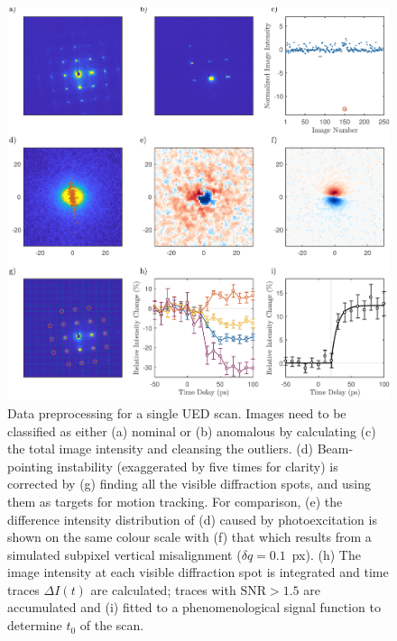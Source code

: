 \begin{figure}[ht!]
  \centering
  \includegraphics[width = \textwidth]{Figures/fig_UED_preprocess.pdf}
  \caption[Data preprocessing for a single UED scan.]{
  Data preprocessing for a single UED scan.
  Images need to be classified as either (a) nominal or (b) anomalous
  by calculating (c) the total image intensity and cleansing the outliers.
  (d) Beam-pointing instability (exaggerated by five times for clarity)
  is corrected by (g) finding all the visible diffraction spots,
  and using them as targets for motion tracking.
  For comparison, (e) the difference intensity distribution of (d) caused by photoexcitation
  is shown on the same colour scale with
  (f) that which results from a simulated subpixel vertical misalignment ($\delta q = 0.1$~px).
  (h) The image intensity at each visible diffraction spot is integrated and time traces $\Delta I(t)$
  are calculated; traces with $\text{SNR} > 1.5$ are accumulated and (i) fitted to
  a phenomenological signal function to determine $t_0$ of the scan.
  }
  \label{fig: UED-preprocess}
\end{figure}

